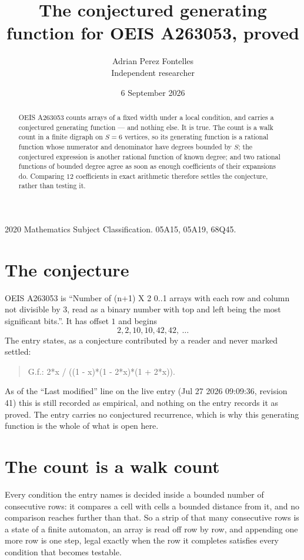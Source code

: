 \documentclass[11pt,a4paper]{article}
\title{The conjectured generating function for OEIS A263053, proved}
\author{Adrian Perez Fontelles\\ \small Independent researcher}
\date{6 September 2026}
\theoremstyle{plain}
\theoremstyle{definition}
\begin{document}
\maketitle

\begin{abstract}
OEIS A263053 counts arrays of a fixed width under a local condition, and carries a conjectured
generating function --- and nothing else. It is true. The count is a walk count in a finite
digraph on $S=6$ vertices, so its generating function is a rational function whose numerator
and denominator have degrees bounded by $S$; the conjectured expression is another rational
function of known degree; and two rational functions of bounded degree agree as soon as enough
coefficients of their expansions do. Comparing $12$ coefficients in exact arithmetic
therefore settles the conjecture, rather than testing it.
\end{abstract}

\noindent\small 2020 Mathematics Subject Classification. 05A15, 05A19, 68Q45.\normalsize

\section{The conjecture}

OEIS A263053 is ``Number of (n+1) X 2 0..1 arrays with each row and column not divisible by 3, read as a binary number with top and left being the most significant bits.''. It has offset $1$ and begins
\[
2, 2, 10, 10, 42, 42,\ \dots
\]
The entry states, as a conjecture contributed by a reader and never marked settled:
\begin{quote}
G.f.: 2*x / ((1 - x)*(1 - 2*x)*(1 + 2*x)).
\end{quote}
As of the ``Last modified'' line on the live entry (Jul 27 2026 09:09:36, revision 41) this is still
recorded as empirical, and nothing on the entry records it as proved. The entry carries no
conjectured recurrence, which is why this generating function is the whole of what is open
here.

\section{The count is a walk count}

Every condition the entry names is decided inside a bounded number of consecutive rows: it
compares a cell with cells a bounded distance from it, and no comparison reaches further than
that. So a strip of that many consecutive rows is a state of a finite automaton, an array is
read off row by row, and appending one more row is one step, legal exactly when the row it
completes satisfies every condition that becomes testable.
\end{document}
